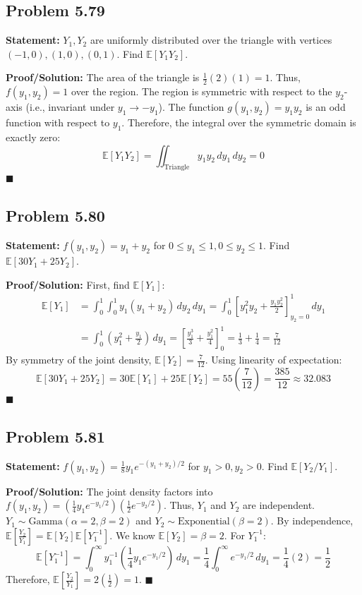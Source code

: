 \documentclass[11pt, a4paper]{article}
\theoremstyle{definition}
\theoremstyle{remark}
\newcommand{\E}{\mathbb{E}}
\begin{document}
\subsection{Problem 5.79}
\textbf{Statement:} $Y_1, Y_2$ are uniformly distributed over the triangle with vertices $(-1,0), (1,0), (0,1)$. Find $\E[Y_1 Y_2]$.

\textbf{Proof/Solution:}
The area of the triangle is $\frac{1}{2}(2)(1) = 1$. Thus, $f(y_1, y_2) = 1$ over the region.
The region is symmetric with respect to the $y_2$-axis (i.e., invariant under $y_1 \to -y_1$).
The function $g(y_1, y_2) = y_1 y_2$ is an odd function with respect to $y_1$.
Therefore, the integral over the symmetric domain is exactly zero:
\[
\E[Y_1 Y_2] = \iint_{\text{Triangle}} y_1 y_2 \, dy_1 \, dy_2 = 0
\]
\hfill $\blacksquare$

\subsection{Problem 5.80}
\textbf{Statement:} $f(y_1, y_2) = y_1 + y_2$ for $0 \leq y_1 \leq 1, 0 \leq y_2 \leq 1$. Find $\E[30Y_1 + 25Y_2]$.

\textbf{Proof/Solution:}
First, find $\E[Y_1]$:
\begin{align*}
    \E[Y_1] &= \int_0^1 \int_0^1 y_1(y_1 + y_2) \, dy_2 \, dy_1 = \int_0^1 \left[ y_1^2 y_2 + \frac{y_1 y_2^2}{2} \right]_{y_2=0}^1 \, dy_1 \\
    &= \int_0^1 \left( y_1^2 + \frac{y_1}{2} \right) \, dy_1 = \left[ \frac{y_1^3}{3} + \frac{y_1^2}{4} \right]_0^1 = \frac{1}{3} + \frac{1}{4} = \frac{7}{12}
\end{align*}
By symmetry of the joint density, $\E[Y_2] = \frac{7}{12}$.
Using linearity of expectation:
\[
\E[30Y_1 + 25Y_2] = 30\E[Y_1] + 25\E[Y_2] = 55 \left(\frac{7}{12}\right) = \frac{385}{12} \approx 32.083
\]
\hfill $\blacksquare$

\subsection{Problem 5.81}
\textbf{Statement:} $f(y_1, y_2) = \frac{1}{8} y_1 e^{-(y_1+y_2)/2}$ for $y_1 > 0, y_2 > 0$. Find $\E[Y_2 / Y_1]$.

\textbf{Proof/Solution:}
The joint density factors into $f(y_1, y_2) = \left( \frac{1}{4} y_1 e^{-y_1/2} \right) \left( \frac{1}{2} e^{-y_2/2} \right)$.
Thus, $Y_1$ and $Y_2$ are independent. $Y_1 \sim \text{Gamma}(\alpha=2, \beta=2)$ and $Y_2 \sim \text{Exponential}(\beta=2)$.
By independence, $\E\left[\frac{Y_2}{Y_1}\right] = \E[Y_2] \E[Y_1^{-1}]$.
We know $\E[Y_2] = \beta = 2$.
For $Y_1^{-1}$:
\[
\E[Y_1^{-1}] = \int_0^\infty y_1^{-1} \left( \frac{1}{4} y_1 e^{-y_1/2} \right) \, dy_1 = \frac{1}{4} \int_0^\infty e^{-y_1/2} \, dy_1 = \frac{1}{4} (2) = \frac{1}{2}
\]
Therefore, $\E\left[\frac{Y_2}{Y_1}\right] = 2 \left(\frac{1}{2}\right) = 1$.
\hfill $\blacksquare$
\end{document}
